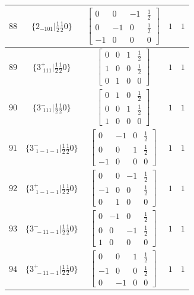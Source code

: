 \documentclass[fleqn,8pt]{jsarticle}
\begin{document}
\begin{longtable}{ccccc}
$ 88 $ & $ \{2{}_{-101}|\frac{1}{2} \frac{1}{2} 0\} $ & $ \begin{bmatrix} 0 & 0 & -1 & \frac{1}{2} \\ 0 & -1 & 0 & \frac{1}{2} \\ -1 & 0 & 0 & 0 \end{bmatrix} $ & $ 1 $ & $ 1 $ \\ \hline
$ 89 $ & $ \{3^{+}_{\,\,111}|\frac{1}{2} \frac{1}{2} 0\} $ & $ \begin{bmatrix} 0 & 0 & 1 & \frac{1}{2} \\ 1 & 0 & 0 & \frac{1}{2} \\ 0 & 1 & 0 & 0 \end{bmatrix} $ & $ 1 $ & $ 1 $ \\ \hline
$ 90 $ & $ \{3^{-}_{\,\,111}|\frac{1}{2} \frac{1}{2} 0\} $ & $ \begin{bmatrix} 0 & 1 & 0 & \frac{1}{2} \\ 0 & 0 & 1 & \frac{1}{2} \\ 1 & 0 & 0 & 0 \end{bmatrix} $ & $ 1 $ & $ 1 $ \\ \hline
$ 91 $ & $ \{3^{-}_{\,\,1-1-1}|\frac{1}{2} \frac{1}{2} 0\} $ & $ \begin{bmatrix} 0 & -1 & 0 & \frac{1}{2} \\ 0 & 0 & 1 & \frac{1}{2} \\ -1 & 0 & 0 & 0 \end{bmatrix} $ & $ 1 $ & $ 1 $ \\ \hline
$ 92 $ & $ \{3^{+}_{\,\,1-1-1}|\frac{1}{2} \frac{1}{2} 0\} $ & $ \begin{bmatrix} 0 & 0 & -1 & \frac{1}{2} \\ -1 & 0 & 0 & \frac{1}{2} \\ 0 & 1 & 0 & 0 \end{bmatrix} $ & $ 1 $ & $ 1 $ \\ \hline
$ 93 $ & $ \{3^{-}_{\,\,-11-1}|\frac{1}{2} \frac{1}{2} 0\} $ & $ \begin{bmatrix} 0 & -1 & 0 & \frac{1}{2} \\ 0 & 0 & -1 & \frac{1}{2} \\ 1 & 0 & 0 & 0 \end{bmatrix} $ & $ 1 $ & $ 1 $ \\ \hline
$ 94 $ & $ \{3^{+}_{\,\,-11-1}|\frac{1}{2} \frac{1}{2} 0\} $ & $ \begin{bmatrix} 0 & 0 & 1 & \frac{1}{2} \\ -1 & 0 & 0 & \frac{1}{2} \\ 0 & -1 & 0 & 0 \end{bmatrix} $ & $ 1 $ & $ 1 $ \\ \hline

\end{longtable}
\end{document}
